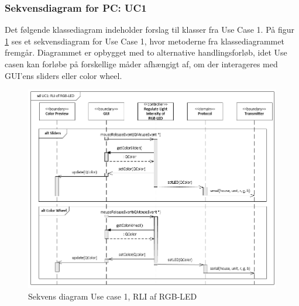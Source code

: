 \documentclass[oneside]{memoir}
\begin{document}
\subsubsection{Sekvensdiagram for PC: UC1}
Det følgende klassediagram indeholder forslag til klasser fra Use Case 1. 
På figur \ref{fig:SD-UC1} ses et sekvensdiagram for Use Case 1, hvor metoderne fra klassediagrammet fremgår. Diagrammet er opbygget med to alternative handlingsforløb, idet Use casen kan forløbe på forskellige måder afhængigt af, om der interageres med GUI’ens sliders eller color wheel.
\begin{figure}[H]
	\centering
	\includegraphics[width=1\linewidth]{"billeder til latex/SD - UC1"}
	\caption{Sekvens diagram Use case 1, RLI af RGB-LED}
	\label{fig:SD-UC1}
\end{figure}
\end{document}
